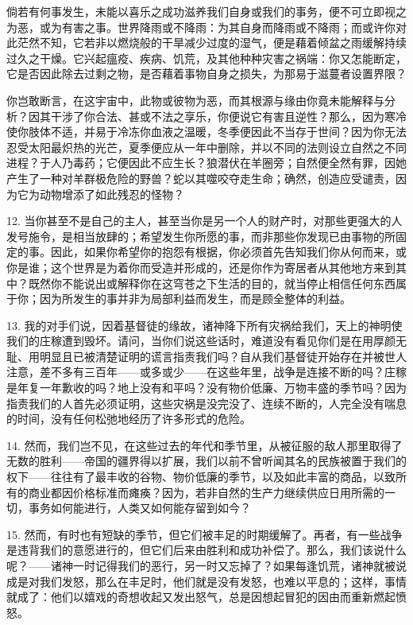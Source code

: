 倘若有何事发生，未能以喜乐之成功滋养我们自身或我们的事务，便不可立即视之为恶，或为有害之事。世界降雨或不降雨：为其自身而降雨或不降雨；而或许你对此茫然不知，它若非以燃烧般的干旱减少过度的湿气，便是藉着倾盆之雨缓解持续过久之干燥。它兴起瘟疫、疾病、饥荒，及其他种种灾害之祸端：你又怎能断定，它是否因此除去过剩之物，是否藉着事物自身之损失，为那易于滋蔓者设置界限？\par

你岂敢断言，在这宇宙中，此物或彼物为恶，而其根源与缘由你竟未能解释与分析？因其干涉了你合法、甚或不法之享乐，你便说它有害且逆性？那么，因为寒冷使你肢体不适，并易于冷冻你血液之温暖，冬季便因此不当存于世间？因为你无法忍受太阳最炽热的光芒，夏季便应从一年中删除，并以不同的法则设立自然之不同进程？于人乃毒药；它便因此不应生长？狼潜伏在羊圈旁；自然便全然有罪，因她产生了一种对羊群极危险的野兽？蛇以其噬咬夺走生命；确然，创造应受谴责，因为它为动物增添了如此残忍的怪物？\par

12. 当你甚至不是自己的主人，甚至当你是另一个人的财产时，对那些更强大的人发号施令，是相当放肆的；希望发生你所愿的事，而非那些你发现已由事物的所固定的事。因此，如果你希望你的抱怨有根据，你必须首先告知我们你从何而来，或你是谁；这个世界是为着你而受造并形成的，还是你作为寄居者从其他地方来到其中？既然你不能说出或解释你在这穹苍之下生活的目的，就当停止相信任何东西属于你；因为所发生的事并非为局部利益而发生，而是顾全整体的利益。\par

13. 我的对手们说，因着基督徒的缘故，诸神降下所有灾祸给我们，天上的神明使我们的庄稼遭到毁坏。请问，当你们说这些话时，难道没有看见你们是在用厚颜无耻、用明显且已被清楚证明的谎言指责我们吗？自从我们基督徒开始存在并被世人注意，差不多有三百年——或多或少——在这些年里，战争是连接不断的吗？庄稼是年复一年歉收的吗？地上没有和平吗？没有物价低廉、万物丰盛的季节吗？因为指责我们的人首先必须证明，这些灾祸是没完没了、连续不断的，人完全没有喘息的时间，没有任何松弛地经历了许多形式的危险。\par

14. 然而，我们岂不见，在这些过去的年代和季节里，从被征服的敌人那里取得了无数的胜利——帝国的疆界得以扩展，我们以前不曾听闻其名的民族被置于我们的权下——往往有了最丰收的谷物、物价低廉的季节，以及如此丰富的商品，以致所有的商业都因价格标准而瘫痪？因为，若非自然的生产力继续供应日用所需的一切，事务如何能进行，人类又如何能存留到如今？\par

15. 然而，有时也有短缺的季节，但它们被丰足的时期缓解了。再者，有一些战争是违背我们的意愿进行的，但它们后来由胜利和成功补偿了。那么，我们该说什么呢？——诸神一时记得我们的恶行，另一时又忘掉了？如果每逢饥荒，诸神就被说成是对我们发怒，那么在丰足时，他们就是没有发怒，也难以平息的；这样，事情就成了：他们以嬉戏的奇想收起又发出怒气，总是因想起冒犯的因由而重新燃起愤怒。\par

